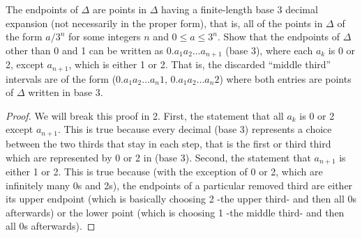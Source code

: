 \begin{exercise}{23}
The endpoints of $\Delta$ are points in $\Delta$ having a finite-length base 3 decimal expansion (not necessarily in the proper form), that is, all of the points in $\Delta$ of the form $a/3^n$ for some integers $n$ and $0\leq a\leq 3^n$. Show that the endpoints of $\Delta$ other than 0 and 1 can be written as $0.a_1a_2\dots a_{n+1}$ (base 3), where each $a_k$ is 0 or 2, except $a_{n+1}$, which is either 1 or 2. That is, the discarded ``middle third'' intervals are of the form ($0.a_1a_2\dots a_{n}1,\, 0.a_1a_2\dots a_n2$) where both entries are points of $\Delta$ written in base 3.
\end{exercise}
\begin{proof}
We will break this proof in 2. First, the statement that all $a_k$ is 0 or 2 except $a_{n+1}$. This is true because every decimal (base 3) represents a choice between the two thirds that stay in each step, that is the first or third third which are represented by 0 or 2 in (base 3). Second, the statement that $a_{n+1}$ is either 1 or 2. This is true because (with the exception of 0 or 2, which are infinitely many 0s and 2s), the endpoints of a particular removed third are either its upper endpoint (which is basically choosing 2 -the upper third- and then all 0s afterwards) or the lower point (which is choosing 1 -the middle third- and then all 0s afterwards).
\end{proof} 

